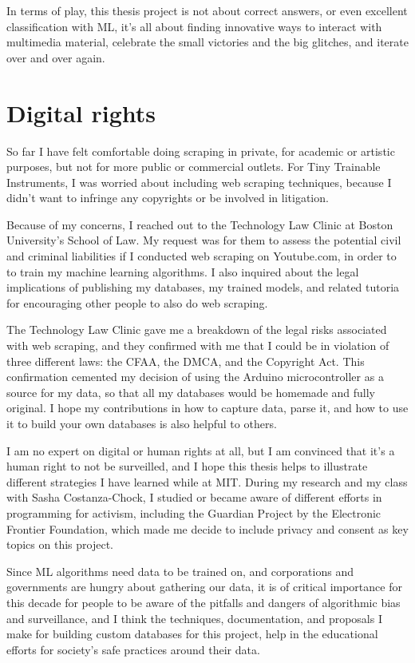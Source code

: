 In terms of play, this thesis project is not about correct answers, or even excellent classification with \acrshort{ML}, it's all about finding innovative ways to interact with multimedia material, celebrate the small victories and the big glitches, and iterate over and over again.

\section{Digital rights}


So far I have felt comfortable doing scraping in private, for academic or artistic purposes, but not for more public or commercial outlets. For Tiny Trainable Instruments, I was worried about including web scraping techniques, because I didn't want to infringe any copyrights or be involved in litigation.

Because of my concerns, I reached out to the Technology Law Clinic \cite{website-boston-university-technology-law-clinic} at Boston University's School of Law. My request was for them to assess the potential civil and criminal liabilities if I conducted web scraping on Youtube.com, in order to to train my machine learning algorithms. I also inquired about the legal implications of publishing my databases, my trained models, and related tutoria for encouraging other people to also do web scraping.

The Technology Law Clinic gave me a breakdown of the legal risks associated with web scraping, and they confirmed with me that I could be in violation of three different laws: the \acrfull{CFAA}, the \acrfull{DMCA}, and the Copyright Act. This confirmation cemented my decision of using the Arduino microcontroller as a source for my data, so that all my databases would be homemade and fully original. I hope my contributions in how to capture data, parse it, and how to use it to build your own databases is also helpful to others.

I am no expert on digital or human rights at all, but I am convinced that it's a human right to not be surveilled, and I hope this thesis helps to illustrate different strategies I have learned while at MIT. During my research and my class with Sasha Costanza-Chock, I studied or became aware of different efforts in programming for activism, including the Guardian Project by the Electronic Frontier Foundation, which made me decide to include privacy and consent as key topics on this project.

Since \acrshort{ML} algorithms need data to be trained on, and corporations and governments are hungry about gathering our data, it is of critical importance for this decade for people to be aware of the pitfalls and dangers of algorithmic bias and surveillance, and I think the techniques, documentation, and proposals I make for building custom databases for this project, help in the educational efforts for society's safe practices around their data.

